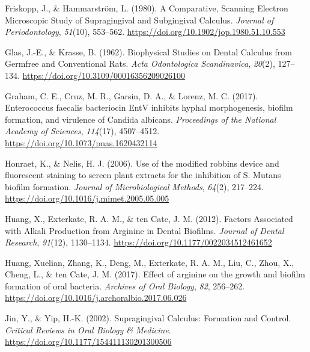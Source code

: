 \documentclass[
  letterpaper,
]{book}
\newlength{\cslhangindent}
\newlength{\cslentryspacingunit} %
\newenvironment{CSLReferences}[2] %
 {%
  \setlength{\parindent}{0pt}
  \ifodd #1
  \let\oldpar\par
  \def\par{\hangindent=\cslhangindent\oldpar}
  \fi
  \setlength{\parskip}{#2\cslentryspacingunit}
 }%
 {}
\begin{document}
\begin{CSLReferences}{1}{0}
\leavevmode{}%
Friskopp, J., \& Hammarström, L. (1980). A {Comparative}, {Scanning
Electron Microscopic Study} of {Supragingival} and {Subgingival
Calculus}. \emph{Journal of Periodontology}, \emph{51}(10), 553--562.
\url{https://doi.org/10.1902/jop.1980.51.10.553}

\leavevmode{}%
Glas, J.-E., \& Krasse, B. (1962). Biophysical {Studies} on {Dental
Calculus} from {Germfree} and {Conventional Rats}. \emph{Acta
Odontologica Scandinavica}, \emph{20}(2), 127--134.
\url{https://doi.org/10.3109/00016356209026100}

\leavevmode{}%
Graham, C. E., Cruz, M. R., Garsin, D. A., \& Lorenz, M. C. (2017).
Enterococcus faecalis bacteriocin {EntV} inhibits hyphal morphogenesis,
biofilm formation, and virulence of {Candida} albicans.
\emph{Proceedings of the National Academy of Sciences}, \emph{114}(17),
4507--4512. \url{https://doi.org/10.1073/pnas.1620432114}

\leavevmode{}%
Honraet, K., \& Nelis, H. J. (2006). Use of the modified robbins device
and fluorescent staining to screen plant extracts for the inhibition of
{S}. Mutans biofilm formation. \emph{Journal of Microbiological
Methods}, \emph{64}(2), 217--224.
\url{https://doi.org/10.1016/j.mimet.2005.05.005}

\leavevmode{}%
Huang, X., Exterkate, R. A. M., \& ten Cate, J. M. (2012). Factors
{Associated} with {Alkali Production} from {Arginine} in {Dental
Biofilms}. \emph{Journal of Dental Research}, \emph{91}(12), 1130--1134.
\url{https://doi.org/10.1177/0022034512461652}

\leavevmode{}%
Huang, Xuelian, Zhang, K., Deng, M., Exterkate, R. A. M., Liu, C., Zhou,
X., Cheng, L., \& ten Cate, J. M. (2017). Effect of arginine on the
growth and biofilm formation of oral bacteria. \emph{Archives of Oral
Biology}, \emph{82}, 256--262.
\url{https://doi.org/10.1016/j.archoralbio.2017.06.026}

\leavevmode{}%
Jin, Y., \& Yip, H.-K. (2002). Supragingival {Calculus}: {Formation} and
{Control}. \emph{Critical Reviews in Oral Biology \& Medicine}.
\url{https://doi.org/10.1177/154411130201300506}


\end{CSLReferences}
\end{document}
